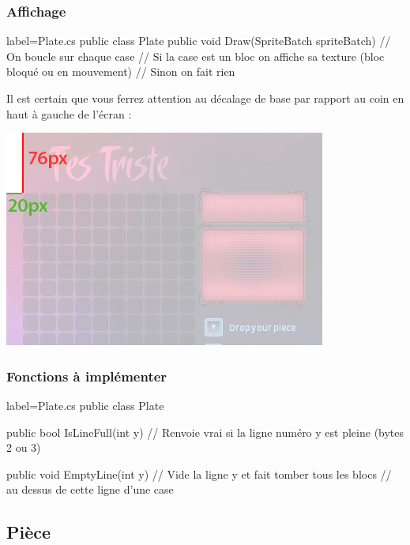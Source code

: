 \documentclass[a4paper]{article}
\begin{document}
\subsubsection{Affichage}

\begin{csharpcode*}{label=Plate.cs}
public class Plate
{
    public void Draw(SpriteBatch spriteBatch)
    {
        // On boucle sur chaque case
        // Si la case est un bloc on affiche sa texture (bloc bloqué ou en mouvement)
        // Sinon on fait rien
    }
}
\end{csharpcode*}

Il est certain que vous ferrez attention au décalage de base par rapport au
coin en haut à gauche de l'écran : \\

\begin{center}
    \includegraphics[scale=0.5]{img/decalage.png}
\end{center}

\subsubsection{Fonctions à implémenter}

\begin{csharpcode*}{label=Plate.cs}
public class Plate
{
    public bool IsLineFull(int y)
    {
        // Renvoie vrai si la ligne numéro y est pleine (bytes 2 ou 3)
    }
    
    public void EmptyLine(int y)
    {
        // Vide la ligne y et fait tomber tous les blocs
        // au dessus de cette ligne d'une case
    }
}
\end{csharpcode*}

\subsection{Pièce}
\end{document}
